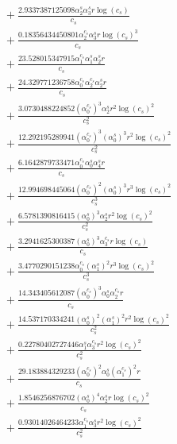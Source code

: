 \documentclass[10pt]{article}
\begin{document}
\begin{align*}
&{}  + \frac{2.9337387125098 \alpha_{2}^s \alpha_{3}^s r \log{\left(c_{s} \right)}}{c_{s}} \\
&{}  + \frac{0.18356434450801 \alpha_{2}^{c_s} \alpha_{3}^s r \log{\left(c_{s} \right)}^{3}}{c_{s}} \\
&{}  + \frac{23.528015347915 \alpha_{1}^{c_s} \alpha_{1}^s \alpha_{2}^s r}{c_{s}} \\
&{}  + \frac{24.329771236758 \alpha_{0}^{c_s} \alpha_{2}^{c_s} \alpha_{2}^s r}{c_{s}} \\
&{}  + \frac{3.0730488224852 \left(\alpha_{0}^{c_s}\right)^{3} \alpha_{2}^s r^{2} \log{\left(c_{s} \right)}^{2}}{c_{s}^{2}} \\
&{}  + \frac{12.292195289941 \left(\alpha_{0}^{c_s}\right)^{3} \left(\alpha_{0}^s\right)^{3} r^{2} \log{\left(c_{s} \right)}^{2}}{c_{s}^{2}} \\
&{}  + \frac{6.1642879733471 \alpha_{0}^{c_s} \alpha_{0}^s \alpha_{4}^s r}{c_{s}} \\
&{}  + \frac{12.994698445064 \left(\alpha_{0}^{c_s}\right)^{2} \left(\alpha_{0}^s\right)^{3} r^{3} \log{\left(c_{s} \right)}^{2}}{c_{s}^{3}} \\
&{}  + \frac{6.5781390816415 \left(\alpha_{0}^s\right)^{3} \alpha_{2}^s r^{2} \log{\left(c_{s} \right)}^{2}}{c_{s}^{2}} \\
&{}  + \frac{3.2941625300387 \left(\alpha_{0}^s\right)^{3} \alpha_{3}^{c_s} r \log{\left(c_{s} \right)}}{c_{s}} \\
&{}  + \frac{3.4770290151238 \alpha_{0}^{c_s} \left(\alpha_{1}^s\right)^{2} r^{3} \log{\left(c_{s} \right)}^{2}}{c_{s}^{3}} \\
&{}  + \frac{14.343405612087 \left(\alpha_{0}^{c_s}\right)^{3} \alpha_{0}^s \alpha_{2}^{c_s} r}{c_{s}} \\
&{}  + \frac{14.537170334241 \left(\alpha_{0}^s\right)^{2} \left(\alpha_{1}^s\right)^{2} r^{2} \log{\left(c_{s} \right)}^{2}}{c_{s}^{2}} \\
&{}  + \frac{0.22780402727446 \alpha_{1}^s \alpha_{3}^{c_s} r^{2} \log{\left(c_{s} \right)}^{2}}{c_{s}^{2}} \\
&{}  + \frac{29.183884329233 \left(\alpha_{0}^{c_s}\right)^{2} \alpha_{0}^s \left(\alpha_{1}^{c_s}\right)^{2} r}{c_{s}} \\
&{}  + \frac{1.8546256876702 \left(\alpha_{0}^s\right)^{4} \alpha_{2}^s r \log{\left(c_{s} \right)}^{2}}{c_{s}} \\
&{}  + \frac{0.93014026464233 \alpha_{1}^{c_s} \alpha_{3}^s r^{2} \log{\left(c_{s} \right)}^{2}}{c_{s}^{2}} \\

\end{align*}
\end{document}
